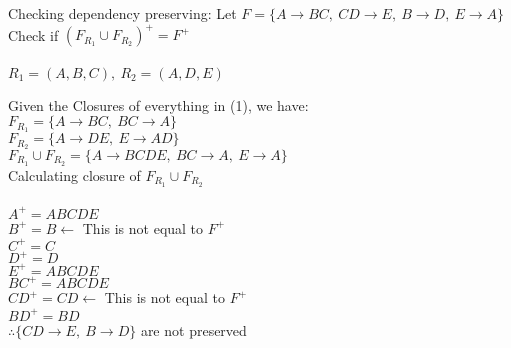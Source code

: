 \documentclass[12pt]{article}
\begin{document}
Checking dependency preserving: Let $F=\{A\rightarrow BC,\ CD \rightarrow E,\ B \rightarrow D,\ E \rightarrow A\}$
Check if $(F_{R_1} \cup F_{R_2})^+ = F^+$\\\\

$R_1 = (A, B, C),\ R_2 = (A, D, E)$

Given the Closures of everything in (1), we have:\\
$F_{R_1} = \{A \rightarrow BC,\ BC \rightarrow A\}$\\
$F_{R_2} = \{A \rightarrow DE,\ E \rightarrow AD\}$\\

$F_{R_1} \cup F_{R_2} = \{A \rightarrow BCDE,\ BC \rightarrow A,\ E \rightarrow A\}$\\

Calculating closure of $F_{R_1} \cup F_{R_2}$\\\\

$A^+ =ABCDE$\\
${B}^+=B \leftarrow$ This is not equal to $F^+$ \\
${C}^+=C$\\
${D}^+=D$\\
${E}^+=ABCDE$\\
${BC}^+= ABCDE$\\
${CD}^+=CD \leftarrow$  This is not equal to $F^+$\\
${BD}^+=BD$\\

$\therefore \{CD \rightarrow E,\ B \rightarrow D\}$ are not preserved
\end{document}
